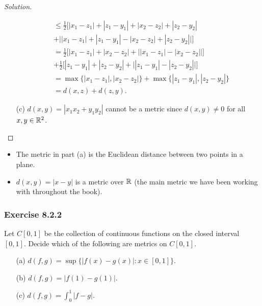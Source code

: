 \begin{proof}[Solution]
\begin{enumerate}
\begin{align*}
                   &\leq \frac{ 1 }{ 2 } \Big[ | x_{1} - z_{1} | + | z_{1} - y_{1}   |   + | x_{2} - z_{2} | + | z_{2} - y_{2} |  \\ 
                   &+ \Big| | x_{1} -  z_{1}  | + | z_{1} - y_{1} |  - | x_{2} - z_{2} | + | z_{2} - y_{2} |    \Big|  \Big] \\
                   &= \frac{ 1 }{ 2 }  \Big[  | x_{1} - z_{1}  |  + | x_{2} - z_{2} | + \Big| | x_{1} - z_{1} |  - | x_{2} - z_{2} |  \Big|  \Big] \\ 
                   &+ \frac{ 1 }{ 2 }  \Big[ | z_{1} - y_{1} | + | z_{2} - y_{2} | + \Big| | z_{1} - y_{1}  |  - | z_{2} - y_{2} |  \Big|   \Big] \\
                   &= \max \{ | x_{1} -  z_{1} |, | x_{2} - z_{2} |  \} + \max \{ | z_{1} - y_{1} |, | z_{2} - y_{2} |  \} \\ 
                   &= d(x,z) +  d(z,y). 
        \end{align*}
    \item[(c)] \( d(x,y) = | x_{1}x_{2} + y_{1}y_{2} |  \) cannot be a metric since \( d(x,y) \neq 0  \) for all \( x,y \in \mathbb{R}^{2} \).
    \end{enumerate}
\end{proof}

\begin{itemize}
    \item The metric in part (a) is the Euclidean distance between two points in a plane.
    \item \( d(x,y) = |   x - y  |   \) is a metric over \( \mathbb{R}  \) (the main metric we have been working with throughout the book).
\end{itemize}

\subsubsection{Exercise 8.2.2} Let \( C[0,1]  \) be the collection of continuous functions on the closed interval \( [0,1]  \). Decide which of the following are metrics on \( C[0,1] \).
\begin{enumerate}
    \item[(a)] \( d(f,g) = \sup \{ | f(x) - g(x)  | : x \in [0,1] \}  \).
    \item[(b)] \( d(f,g) = | f(1) - g(1) |  \).
    \item[(c)] \( d(f,g) = \int_{ 0 }^{ 1 }  | f - g |   \).
\end{enumerate}

